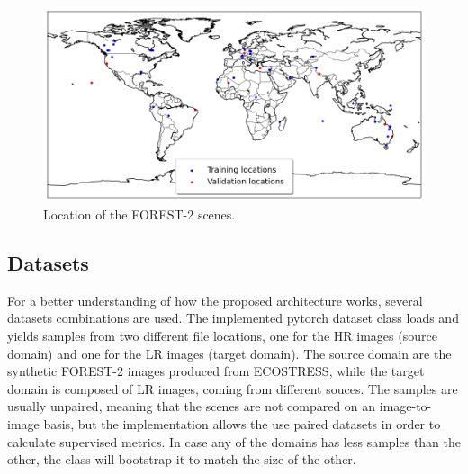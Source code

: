 \begin{figure}[H]
    \centering
    \includegraphics[width=\linewidth]{Includes/4-forest-locations.png}
    \caption{Location of the FOREST-2 scenes.}
    \label{fig:4-forest-locations}
\end{figure}


\subsection{Datasets}

For a better understanding of how the proposed architecture works, several datasets combinations are used. 
The implemented pytorch dataset class loads and yields samples from two different file locations, one for the HR images (source domain) and one for the LR images (target domain). 
The source domain are the synthetic FOREST-2 images produced from ECOSTRESS, while the target domain is composed of LR images, coming from different souces.
The samples are usually unpaired, meaning that the scenes are not compared on an image-to-image basis, but the implementation allows the use paired datasets in order to calculate supervised metrics. 
In case any of the domains has less samples than the other, the class will bootstrap it to match the size of the other.



